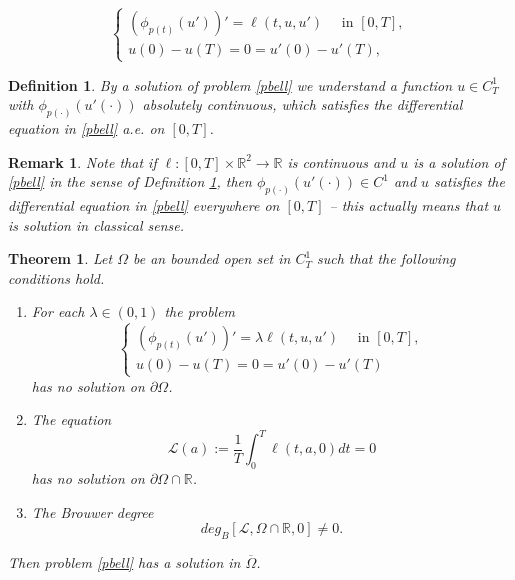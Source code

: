 \documentclass[10pt,a4paper]{amsart}
\newtheorem{definition}{Definition}
\newtheorem{remark}{Remark}
\newtheorem{theorem}{Theorem}
\begin{document}
\begin{equation}\label{pbell}
	\left \{
            \begin{array}{ll}
		      (\phi_{p(t)}(u'))'=\ell(t,u,u')\quad \mbox{ in }[0,T],\\
		      u(0)-u(T)=0=u'(0)-u'(T),
			\end{array}
    \right.
\end{equation}

\begin{definition}\label{def1}\emph{By a {\it solution} of problem \eqref{pbell} we understand a function $u\in C^1_T$ with $\phi_{p(\cdot )}(u'( \cdot ))$ absolutely continuous, which satisfies the differential equation in \eqref{pbell} a.e. on $[0,T]$.
}
\end{definition}

\begin{remark}\label{remark1} \emph{Note that if $\ell:[0,T]\times\mathbb{R}^2\to\mathbb{R}$ is continuous and $u$ is a solution  of \eqref{pbell} in the sense of Definition \ref{def1}, then $\phi_{p(\cdot )}(u'( \cdot ))\in C^1$ and $u$ satisfies the differential equation in \eqref{pbell} everywhere on $[0,T]$ -- this actually means that $u$ is solution in classical sense.}
\end{remark}

\begin{theorem}\label{thHMMT}
Let $\Omega$ be an bounded open set in $C_T^1$ such that the following conditions hold.
\begin{enumerate}
  \item[$(H_1)$] For each $\lambda\in(0,1)$ the problem
  \begin{equation}\label{pblambda}
	\left \{
            \begin{array}{ll}
		      (\phi_{p(t)}(u'))'=\lambda\ell(t,u,u')\quad \mbox{ in }[0,T],\\
		      u(0)-u(T)=0=u'(0)-u'(T)
			\end{array}
  \right.
\end{equation}
has no solution on $\partial\Omega$.
  \item[$(H_2)$] The equation
  $$\mathcal{L}(a):=\frac{1}{T}\int_0^T\ell(t,a,0)dt=0$$
  has no solution on $\partial\Omega\cap\mathbb{R}$.
  \item[$(H_3)$] The Brouwer degree
  $$deg_B[\mathcal{L},\Omega\cap\mathbb{R},0]\neq0.$$
\end{enumerate}
Then problem \eqref{pbell} has a solution in $\overline{\Omega}$.
\end{theorem}
\end{document}
